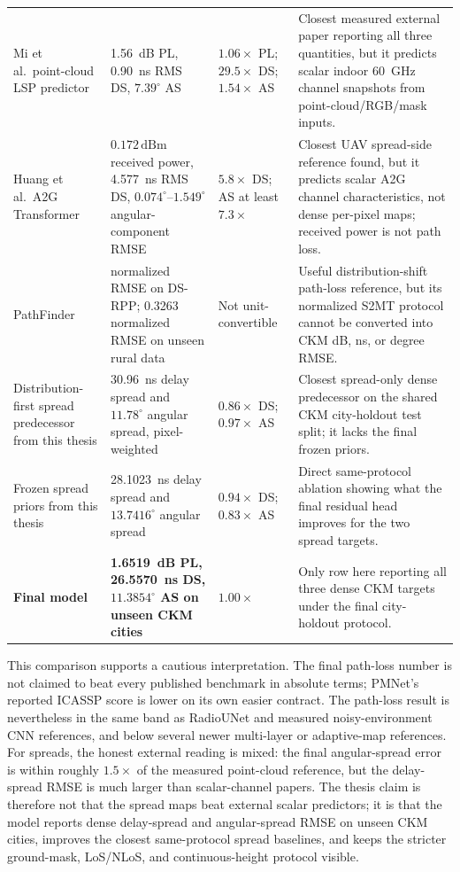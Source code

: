 \begin{table}[H]
\begin{tabularx}{\textwidth}{>{\raggedright\arraybackslash}p{}
>{\raggedright\arraybackslash}p{}
>{\centering\arraybackslash}p{}
>{\raggedright\arraybackslash}X}
Mi et al.\ point-cloud LSP predictor \cite{mi2024pointcloud} &
\SI{1.56}{dB} PL, \SI{0.90}{ns} RMS DS, \(7.39^\circ\) AS &
\(1.06\times\) PL; \(29.5\times\) DS; \(1.54\times\) AS &
Closest measured external paper reporting all three quantities, but it predicts
scalar indoor \SI{60}{GHz} channel snapshots from point-cloud/RGB/mask inputs. \\
Huang et al.\ A2G Transformer \cite{huang2025a2gtransformer} &
\(0.172\,\mathrm{dBm}\) received power, \SI{4.577}{ns} RMS DS, \(0.074^\circ\)--\(1.549^\circ\) angular-component RMSE &
\(5.8\times\) DS; AS at least \(7.3\times\) &
Closest UAV spread-side reference found, but it predicts scalar A2G channel
characteristics, not dense per-pixel maps; received power is not path loss. \\
PathFinder \cite{pathfinder2025} &
0.0331 normalized RMSE on DS-RPP; 0.3263 normalized RMSE on unseen rural data &
Not unit-convertible &
Useful distribution-shift path-loss reference, but its normalized S2MT protocol
cannot be converted into CKM dB, ns, or degree RMSE. \\
Distribution-first spread predecessor from this thesis &
\SI{30.96}{ns} delay spread and \(11.78^\circ\) angular spread, pixel-weighted &
\(0.86\times\) DS; \(0.97\times\) AS &
Closest spread-only dense predecessor on the shared CKM city-holdout test
split; it lacks the final frozen priors. \\
Frozen spread priors from this thesis &
\SI{28.1023}{ns} delay spread and \(13.7416^\circ\) angular spread &
\(0.94\times\) DS; \(0.83\times\) AS &
Direct same-protocol ablation showing what the final residual head improves
for the two spread targets. \\
\textbf{Final model} &
\textbf{\SI{1.6519}{dB} PL, \SI{26.5570}{ns} DS, \(11.3854^\circ\) AS on unseen CKM cities} &
\textbf{\(1.00\times\)} &
Only row here reporting all three dense CKM targets under the final
city-holdout protocol. \\
\bottomrule
\end{tabularx}
\end{table}

This comparison supports a cautious interpretation. The final path-loss number
is not claimed to beat every published benchmark in absolute terms; PMNet's
reported ICASSP score is lower on its own easier contract. The path-loss result
is nevertheless in the same band as RadioUNet and measured noisy-environment
CNN references, and below several newer multi-layer or adaptive-map references.
For spreads, the honest external reading is mixed: the final angular-spread
error is within roughly \(1.5\times\) of the measured point-cloud reference, but
the delay-spread RMSE is much larger than scalar-channel papers. The thesis
claim is therefore not that the spread maps beat external scalar predictors; it
is that the model reports dense delay-spread and angular-spread RMSE on unseen
CKM cities, improves the closest same-protocol spread baselines, and keeps the
stricter ground-mask, LoS/NLoS, and continuous-height protocol visible.

